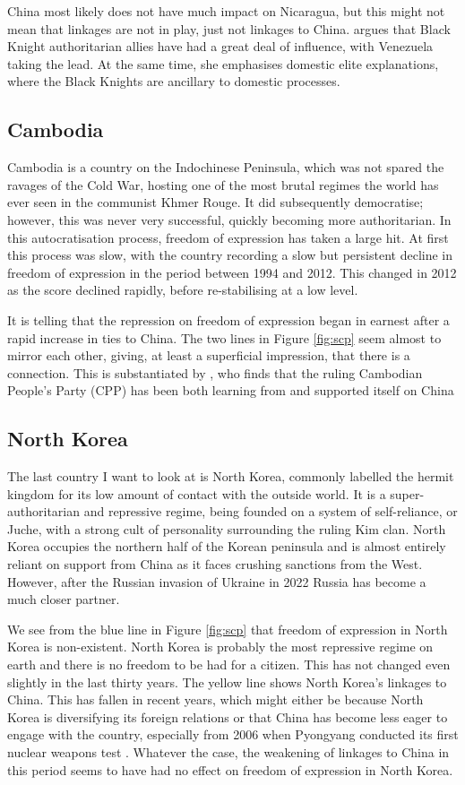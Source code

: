 China most likely does not have much impact on Nicaragua, but this might not mean that linkages are not in play, just not linkages to China. \citet[p. 198]{mcconnell_elite_2024} argues that Black Knight authoritarian allies have had a great deal of influence, with Venezuela taking the lead. At the same time, she emphasises domestic elite explanations, where the Black Knights are ancillary to domestic processes.

\subsection{Cambodia}
Cambodia is a country on the Indochinese Peninsula, which was not spared the ravages of the Cold War, hosting one of the most brutal regimes the world has ever seen in the communist Khmer Rouge. It did subsequently democratise; however, this was never very successful, quickly becoming more authoritarian. In this autocratisation process, freedom of expression has taken a large hit. At first this process was slow, with the country recording a slow but persistent decline in freedom of expression in the period between 1994 and 2012. This changed in 2012 as the score declined rapidly, before re-stabilising at a low level.

It is telling that the repression on freedom of expression began in earnest after a rapid increase in ties to China. The two lines in Figure \ref{fig:scp} seem almost to mirror each other, giving, at least a superficial impression, that there is a connection. This is substantiated by \citet{loughlin_chinese_2021}, who finds that the ruling Cambodian People's Party (CPP) has been both learning from and supported itself on China

\subsection{North Korea}
The last country I want to look at is North Korea, commonly labelled the hermit kingdom for its low amount of contact with the outside world. It is a super-authoritarian and repressive regime, being founded on a system of self-reliance, or Juche, with a strong cult of personality surrounding the ruling Kim clan. North Korea occupies the northern half of the Korean peninsula and is almost entirely reliant on support from China as it faces crushing sanctions from the West. However, after the Russian invasion of Ukraine in 2022 Russia has become a much closer partner.

We see from the blue line in Figure \ref{fig:scp} that freedom of expression in North Korea is non-existent. North Korea is probably the most repressive regime on earth and there is no freedom to be had for a citizen. This has not changed even slightly in the last thirty years. The yellow line shows North Korea's linkages to China. This has fallen in recent years, which might either be because North Korea is diversifying its foreign relations or that China has become less eager to engage with the country, especially from 2006 when Pyongyang conducted its first nuclear weapons test \citep{fong_understanding_2024}. Whatever the case, the weakening of linkages to China in this period seems to have had no effect on freedom of expression in North Korea.

